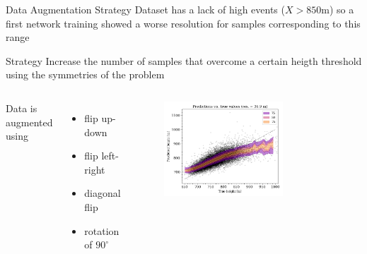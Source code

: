 \documentclass{beamer}
\begin{document}
\begin{frame}{Data Augmentation Strategy}
        Dataset has a lack of high events ($X > 850$m) so a first network training showed a worse resolution
        for samples corresponding to this range
    
        \begin{block}{Strategy}
            Increase the number of samples that overcome a certain heigth threshold using the
            symmetries of the problem
        \end{block}
    
        \begin{columns}
            Data is augmented using
        \begin{itemize}
            \item flip up-down
            \item flip left-right
            \item diagonal flip
            \item rotation of $90^{\circ}$
        \end{itemize}
        \begin{figure}
            \centering
            \includegraphics[width=0.7\textwidth]{figures/long_run_vanilla.png}
        \end{figure}
        \end{columns}
        
        
    
    \end{frame}
\end{document}
